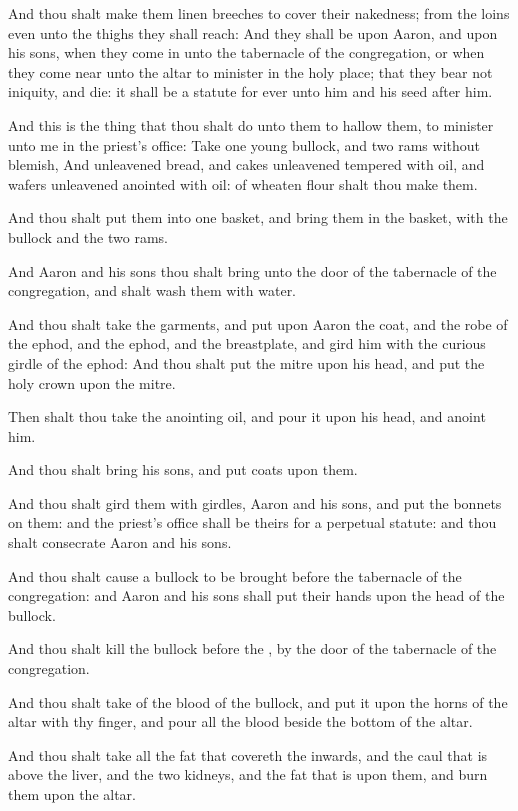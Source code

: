 \Verse And thou shalt make them linen breeches to cover their nakedness; from the loins even unto the thighs they shall reach: \Verse And they shall be upon Aaron, and upon his sons, when they come in unto the tabernacle of the congregation, or when they come near unto the altar to minister in the holy place; that they bear not iniquity, and die: it shall be a statute for ever unto him and his seed after him.

\Chapter
\Verse And this is the thing that thou shalt do unto them to hallow them, to minister unto me in the priest's office: Take one young bullock, and two rams without blemish, \Verse And unleavened bread, and cakes unleavened tempered with oil, and wafers unleavened anointed with oil: of wheaten flour shalt thou make them.

\Verse And thou shalt put them into one basket, and bring them in the basket, with the bullock and the two rams.

\Verse And Aaron and his sons thou shalt bring unto the door of the tabernacle of the congregation, and shalt wash them with water.

\Verse And thou shalt take the garments, and put upon Aaron the coat, and the robe of the ephod, and the ephod, and the breastplate, and gird him with the curious girdle of the ephod: \Verse And thou shalt put the mitre upon his head, and put the holy crown upon the mitre.

\Verse Then shalt thou take the anointing oil, and pour it upon his head, and anoint him.

\Verse And thou shalt bring his sons, and put coats upon them.

\Verse And thou shalt gird them with girdles, Aaron and his sons, and put the bonnets on them: and the priest's office shall be theirs for a perpetual statute: and thou shalt consecrate Aaron and his sons.

\Verse And thou shalt cause a bullock to be brought before the tabernacle of the congregation: and Aaron and his sons shall put their hands upon the head of the bullock.

\Verse And thou shalt kill the bullock before the \LORD, by the door of the tabernacle of the congregation.

\Verse And thou shalt take of the blood of the bullock, and put it upon the horns of the altar with thy finger, and pour all the blood beside the bottom of the altar.

\Verse And thou shalt take all the fat that covereth the inwards, and the caul that is above the liver, and the two kidneys, and the fat that is upon them, and burn them upon the altar.

